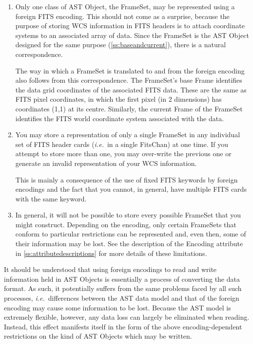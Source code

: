 \documentclass[twoside,11pt]{article}
\newcommand{\appref}[1]{Appendix~\ref{#1}}
\newcommand{\secref}[1]{\S\ref{#1}}
\renewcommand{\appref}[1]{\ref{#1}}
\renewcommand{\secref}[1]{\ref{#1}}
\begin{document}
\begin{enumerate}
\item Only one class of AST Object, the FrameSet, may be represented
using a foreign FITS encoding. This should not come as a surprise,
because the purpose of storing WCS information in FITS headers is to
attach coordinate systems to an associated array of data. Since the
FrameSet is the AST Object designed for the same purpose
(\secref{ss:baseandcurrent}), there is a natural correspondence.

The way in which a FrameSet is translated to and from the foreign
encoding also follows from this correspondence. The FrameSet's base
Frame identifies the data grid coordinates of the associated FITS
data. These are the same as FITS pixel coordinates, in which the first
pixel (in 2 dimensions) has coordinates (1,1) at its
centre. Similarly, the current Frame of the FrameSet identifies the
FITS world coordinate system associated with the data.

\item You may store a representation of only a single FrameSet in any
individual set of FITS header cards ({\em{i.e.}}\ in a single
FitsChan) at one time. If you attempt to store more than one, you may
over-write the previous one or generate an invalid representation of
your WCS information.

This is mainly a consequence of the use of fixed FITS keywords by
foreign encodings and the fact that you cannot, in general, have
multiple FITS cards with the same keyword.

\item In general, it will not be possible to store every possible
FrameSet that you might construct. Depending on the encoding, only
certain FrameSets that conform to particular restrictions can be
represented and, even then, some of their information may be lost. See
the description of the Encoding attribute in
\appref{ss:attributedescriptions} for more details of these
limitations.
\end{enumerate}

It should be understood that using foreign encodings to read and write
information held in AST Objects is essentially a process of converting
the data format. As such, it potentially suffers from the same
problems faced by all such processes, {\em{i.e.}}\ differences between
the AST data model and that of the foreign encoding may cause some
information to be lost.  Because the AST model is extremely flexible,
however, any data loss can largely be eliminated when reading.
Instead, this effect manifests itself in the form of the above
encoding-dependent restrictions on the kind of AST Objects which may
be written.
\end{document}
